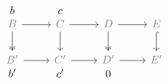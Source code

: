 \documentclass[12pt]{article}
\begin{document}
\begin{equation*}
  \begin{tikzcd}
    b & c \\[-2em]
    \color{gray}B\rar\dar[two heads] & \color{gray}C\rar\dar[black] & \color{gray}D\rar\dar[two heads] & \color{gray}E\dar[hook] \\
    \color{gray}B'\rar &\color{gray} C'\rar &\color{gray} D'\rar &\color{gray} E' \\[-2em]
    b' & c' & 0
  \end{tikzcd}
\end{equation*}
\end{document}
